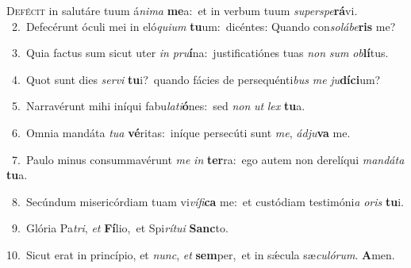 \lettrine{\initial\textcolor{\initialcolor}{D}}{efécit} in salutáre tuum á\-\textit{ni}\-\textit{ma} \textbf{me}\-a:~\star et in verbum tuum \textit{su}\-\textit{per}\textit{spe}\textbf{rá}vi.\\
{\numbfont\textcolor{\numbcolor}{~2.}}~Defecérunt óculi mei in eló\-\textit{qui}\-\textit{um} \textbf{tu}\-um:~\star dicéntes: Quando con\-\textit{so}\-\textit{lá}\textit{be}\textbf{ris} me?\par
{\numbfont\textcolor{\numbcolor}{~3.}}~Quia factus sum sicut uter \textit{in} \textit{pru}\-\textbf{í}na:~\star justificatiónes tuas \textit{non} \textit{sum} \textit{ob}\-\textbf{lí}tus.\par
{\numbfont\textcolor{\numbcolor}{~4.}}~Quot sunt dies \textit{ser}\-\textit{vi} \textbf{tu}\-i?~\star quando fácies de persequénti\textit{bus} \textit{me} \textit{ju}\-\textbf{dí}\textbf{ci}um?\par
{\numbfont\textcolor{\numbcolor}{~5.}}~Narravérunt mihi iníqui fabu\-\textit{la}\-\textit{ti}\textbf{ó}nes:~\star sed \textit{non} \textit{ut} \textit{lex} \textbf{tu}\-a.\par
{\numbfont\textcolor{\numbcolor}{~6.}}~Omnia mandáta \textit{tu}\-\textit{a} \textbf{vé}\-ritas:~\star iníque persecúti sunt \textit{me}\-, \textit{ád}\-\textit{ju}\textbf{va} me.\par
{\numbfont\textcolor{\numbcolor}{~7.}}~Paulo minus consummavérunt \textit{me} \textit{in} \textbf{ter}\-ra:~\star ego autem non derelíqui \textit{man}\-\textit{dá}\textit{ta} \textbf{tu}\-a.\par
{\numbfont\textcolor{\numbcolor}{~8.}}~Secúndum misericórdiam tuam vi\-\textit{ví}\-\textit{fi}\textbf{ca} me:~\star et custódiam testimóni\textit{a} \textit{o}\-\textit{ris} \textbf{tu}\-i.\par
{\numbfont\textcolor{\numbcolor}{~9.}}~Glória Pa\-\textit{tri}\-, \textit{et} \textbf{Fí}\-lio,~\star et Spi\-\textit{rí}\-\textit{tu}\textit{i} \textbf{Sanc}\-to.\par
{\numbfont\textcolor{\numbcolor}{10.}}~Sicut erat in princípio, et \textit{nunc}\-, \textit{et} \textbf{sem}\-per,~\star et in sǽcula sæ\-\textit{cu}\-\textit{ló}\textit{rum}. \textbf{A}\-men.\par
